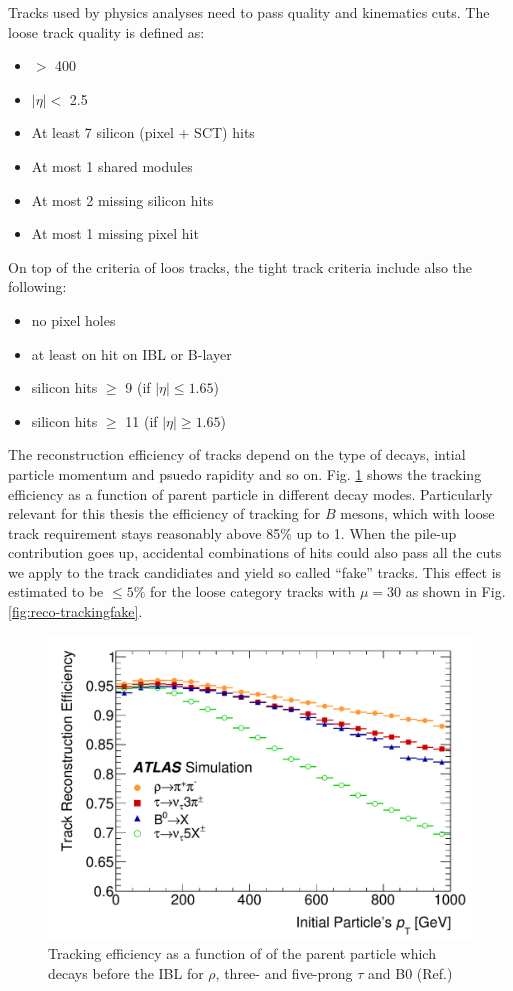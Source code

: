 Tracks used by physics analyses need to pass quality and kinematics cuts. The loose track quality is defined as:

\begin{itemize}
\item \pT $>$ 400 \mev
\item $|\eta| < $ 2.5
\item At least 7 silicon (pixel + SCT) hits
\item At most 1 shared modules
\item At most 2 missing silicon hits
\item At most 1 missing pixel hit
\end{itemize}

On top of the criteria of loos tracks, the tight track criteria include also the following:

\begin{itemize}
\item no pixel holes
\item at least on hit on IBL or B-layer
\item silicon hits $\geq$ 9 (if $|\eta|\leq 1.65$)
\item silicon hits $\geq$ 11 (if $|\eta|\geq 1.65$)
\end{itemize}

The reconstruction efficiency of tracks depend on the type of decays, intial particle momentum and psuedo rapidity and so on. Fig. \ref{fig:reco-trackingeff} shows the tracking efficiency as a function of parent particle \pt in different decay modes. Particularly relevant for this thesis the efficiency of tracking for $B$ mesons, which with loose track requirement stays reasonably above 85\% up to 1\TeV. When the pile-up contribution goes up, accidental combinations of hits could also pass all the cuts we apply to the track candidiates and yield so called ``fake'' tracks. This effect is estimated to be $\leq 5\%$ for the loose category tracks with $\mu = 30$ as shown in Fig.\ref{fig:reco-trackingfake}.


\begin{figure}[htpb!]
\begin{center}
  \includegraphics[width=0.55\linewidth]{figures/Reco/TrackingEfficiency}
  \caption{Tracking efficiency as a function of \pt of the parent particle which decays before the IBL for $\rho$, three- and five-prong $\tau$ and B0 (Ref.\cite{Aaboud:2017all})}
\label{fig:reco-trackingeff}
\end{center}
\end{figure}

